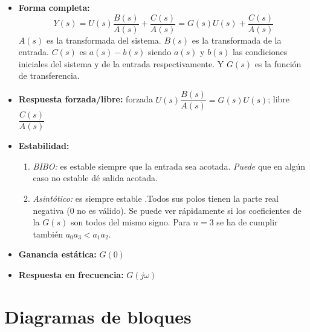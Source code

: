 \documentclass[a4paper, twocolumn, 10pt]{article}
\begin{document}
\begin{itemize}
	\item \textbf{Forma completa:} \[Y(s) = U(s)\frac{B(s)}{A(s)} + \frac{C(s)}{A(s)} = G(s)U(s) + \frac{C(s)}{A(s)}\] $A(s)$ es la transformada del sistema. $B(s)$ es la transformada de la entrada. $C(s)$ es $a(s) - b(s)$ siendo $a(s)$ y $b(s)$ las condiciones iniciales del sistema y de la entrada respectivamente. Y $G(s)$ es la función de transferencia.
	\item \textbf{Respuesta forzada/libre:} forzada $U(s)\dfrac{B(s)}{A(s)} = G(s)U(s)$; libre $\dfrac{C(s)}{A(s)}$
	\item \textbf{Estabilidad:}
	\begin{enumerate}
		\item \textit{BIBO:} es estable siempre que la entrada sea acotada. \textit{Puede} que en algún caso no estable dé salida acotada.
		\item \textit{Asintótico:} es siempre estable .Todos sus polos tienen la parte real negativa (0 no es válido). Se puede ver rápidamente si los coeficientes de la $G(s)$ son todos del mismo signo. Para $n = 3$ se ha de cumplir también $a_0a_3<a_1a_2$.
	\end{enumerate}
	\item \textbf{Ganancia estática:} $G(0)$
	\item \textbf{Respuesta en frecuencia:} $G(j\omega)$
\end{itemize}

\section{Diagramas de bloques}
\end{document}
